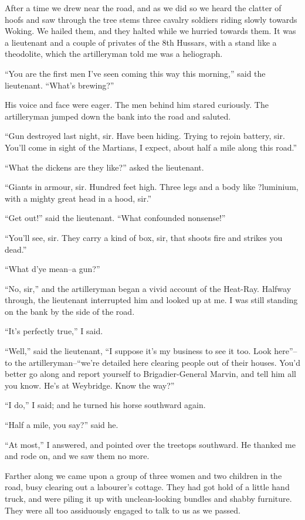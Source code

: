 After a time we drew near the road, and as we did so we heard the
clatter of hoofs and saw through the tree stems three cavalry
soldiers riding slowly towards Woking. We hailed them, and they
halted while we hurried towards them. It was a lieutenant and a
couple of privates of the 8th Hussars, with a stand like a
theodolite, which the artilleryman told me was a heliograph.

``You are the first men I've seen coming this way this morning,''
said the lieutenant. ``What's brewing?''

His voice and face were eager. The men behind him stared curiously.
The artilleryman jumped down the bank into the road and saluted.

``Gun destroyed last night, sir. Have been hiding. Trying to rejoin
battery, sir. You'll come in sight of the Martians, I expect, about
half a mile along this road.''

``What the dickens are they like?'' asked the lieutenant.

``Giants in armour, sir. Hundred feet high. Three legs and a body
like ?luminium, with a mighty great head in a hood, sir.''

``Get out!'' said the lieutenant. ``What confounded nonsense!''

``You'll see, sir. They carry a kind of box, sir, that shoots fire
and strikes you dead.''

``What d'ye mean--a gun?''

``No, sir,'' and the artilleryman began a vivid account of the
Heat-Ray. Halfway through, the lieutenant interrupted him and
looked up at me. I was still standing on the bank by the side of
the road.

``It's perfectly true,'' I said.

``Well,'' said the lieutenant, ``I suppose it's my business to see it
too. Look here''--to the artilleryman--``we're detailed here clearing
people out of their houses. You'd better go along and report
yourself to Brigadier-General Marvin, and tell him all you know.
He's at Weybridge. Know the way?''

``I do,'' I said; and he turned his horse southward again.

``Half a mile, you say?'' said he.

``At most,'' I answered, and pointed over the treetops southward. He
thanked me and rode on, and we saw them no more.

Farther along we came upon a group of three women and two children
in the road, busy clearing out a labourer's cottage. They had got
hold of a little hand truck, and were piling it up with
unclean-looking bundles and shabby furniture. They were all too
assiduously engaged to talk to us as we passed.

